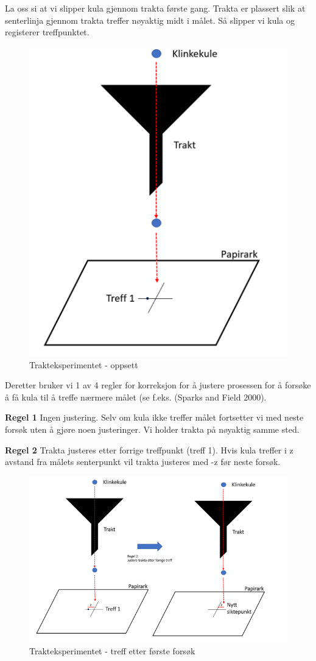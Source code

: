 \documentclass[
]{book}
\begin{document}
La oss si at vi slipper kula gjennom trakta første gang. Trakta er plassert slik at senterlinja gjennom trakta treffer nøyaktig midt i målet. Så slipper vi kula og registerer treffpunktet.

\begin{figure}
\centering
\includegraphics{trakteksp2.png}
\caption{Trakteksperimentet - oppsett}
\end{figure}

Deretter bruker vi 1 av 4 regler for korreksjon for å justere prosessen for å forsøke å få kula til å treffe nærmere målet (se f.eks. (Sparks and Field 2000).

\textbf{Regel 1}
Ingen justering. Selv om kula ikke treffer målet fortsetter vi med neste forsøk uten å gjøre noen justeringer. Vi holder trakta på nøyaktig samme sted.

\textbf{Regel 2}
Trakta justeres etter forrige treffpunkt (treff 1). Hvis kula treffer i z avstand fra målets senterpunkt vil trakta justeres med -z før neste forsøk.

\begin{figure}
\centering
\includegraphics{trakteksp3.png}
\caption{Trakteksperimentet - treff etter første forsøk}
\end{figure}
\end{document}

